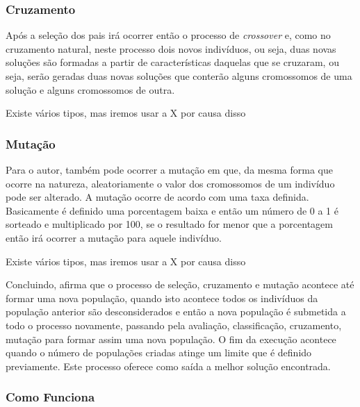 \subsubsection{Cruzamento}

\par Após a seleção dos pais irá ocorrer então o processo de \textit{crossover}
e, como no cruzamento natural, neste processo dois novos indivíduos, ou seja, duas
novas soluções são formadas a partir de características daquelas que se
cruzaram, ou seja, serão geradas duas novas soluções que conterão alguns cromossomos
de uma solução e alguns cromossomos de outra.



Existe vários tipos, mas iremos usar a X por causa disso

\subsubsection{Mutação}

\par Para o autor, também pode ocorrer a mutação em
que, da mesma forma que ocorre na natureza, aleatoriamente o valor dos
cromossomos de um indivíduo pode ser alterado. A mutação ocorre de acordo com
uma taxa definida. Basicamente é definido uma porcentagem baixa e então um
número de 0 a 1 é sorteado e multiplicado por 100, se o resultado for menor que
a porcentagem então irá ocorrer a mutação para aquele indivíduo.

Existe vários tipos, mas iremos usar a X por causa disso

\par Concluindo,  afirma que o processo de 
seleção, cruzamento e mutação acontece até formar uma nova população, 
quando isto acontece todos os indivíduos da população anterior são
desconsiderados e então a nova população é submetida a todo o processo
novamente, passando pela avaliação, classificação, cruzamento, mutação para
formar assim uma nova população. O fim da execução acontece quando o
número de populações criadas atinge um limite que é definido previamente.
Este processo oferece como saída a melhor solução encontrada.


\subsubsection{Como Funciona}

